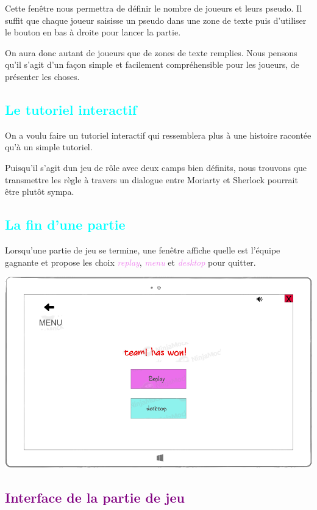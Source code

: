 \documentclass[a4paper]{article}
\let\oldsection\section
\renewcommand{\section}[1]{\textcolor{purple}{\oldsection{#1}}}
\let\oldsubsection\subsection
\renewcommand{\subsection}[1]{\textcolor{cyan}{\oldsubsection{#1}}}
\let\oldtextit\textit
\renewcommand{\textit}[1]{\textcolor{violet}{\oldtextit{#1}}}
\begin{document}
Cette fenêtre nous permettra de définir le nombre de joueurs et leurs pseudo. Il suffit que chaque joueur saisisse un pseudo dans une zone de texte puis d'utiliser le bouton en bas à droite pour lancer la partie.

On aura donc autant de joueurs que de zones de texte remplies. Nous pensons qu'il s'agit d'un façon simple et facilement compréhensible pour les joueurs, de présenter les choses.

\subsection{Le tutoriel interactif}

On a voulu faire un tutoriel interactif qui ressemblera plus à une histoire racontée qu'à un simple tutoriel.

Puisqu'il s'agit dun jeu de rôle avec deux camps bien définits, nous trouvons que transmettre les règle à travers un dialogue entre Moriarty et Sherlock pourrait être plutôt sympa.

\subsection{La fin d'une partie}

Lorsqu'une partie de jeu se termine, une fenêtre affiche quelle est l'équipe gagnante et propose les choix \textit{replay}, \textit{menu} et \textit{desktop} pour quitter.

\begin{center}
    \includegraphics[scale=2]{img/ecran_fin_partie.png}
\end{center}

\section{Interface de la partie de jeu}
\end{document}
